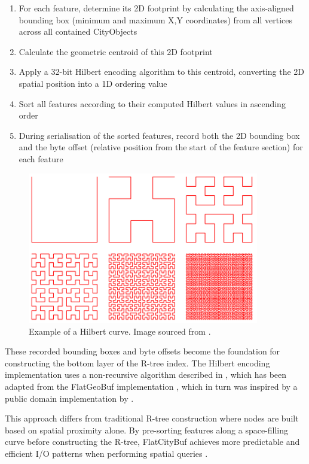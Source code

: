 \begin{enumerate}
  \item For each feature, determine its 2D footprint by calculating the axis-aligned bounding box (minimum and maximum X,Y coordinates) from all vertices across all contained CityObjects
  \item Calculate the geometric centroid of this 2D footprint
  \item Apply a 32-bit Hilbert encoding algorithm to this centroid, converting the 2D spatial position into a 1D ordering value
  \item Sort all features according to their computed Hilbert values in ascending order
  \item During serialisation of the sorted features, record both the 2D bounding box and the byte offset (relative position from the start of the feature section) for each feature
\end{enumerate}

\begin{figure}[ht]
  \centering
  \includegraphics[width=0.9\textwidth]{./figs/methodology/hilbert_sort.png}
  \caption{Example of a Hilbert curve. Image sourced from \cite{horance_2022_detail}.}
  \label{fig:hilbert_curve}
\end{figure}

These recorded bounding boxes and byte offsets become the foundation for constructing the bottom layer of the R-tree index. The Hilbert encoding implementation uses a non-recursive algorithm described in \citet{hacker_delight_2012}, which has been adapted from the FlatGeoBuf implementation \citep{flatgeobuf_github}, which in turn was inspired by a public domain implementation by \citet{rawrunprotected_2016}.

This approach differs from traditional R-tree construction where nodes are built based on spatial proximity alone. By pre-sorting features along a space-filling curve before constructing the R-tree, FlatCityBuf achieves more predictable and efficient I/O patterns when performing spatial queries \citep{horance_2022_overview}.

